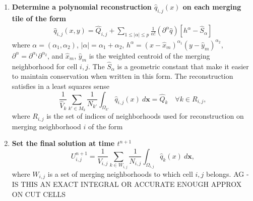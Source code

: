 \begin{enumerate}
\item \textbf{Determine a polynomial reconstruction $\hat q_{i,j}(x)$ on 
each merging tile of the form}
\begin{equation}\label{eq:q}
\begin{aligned}
    \hat q_{i,j} (x,y) = \widehat{Q}_{i,j} +  \sum_{1 \leq |\alpha| \leq p}  \frac{1}{\alpha!} (\partial^{\alpha} \hat q) [h^{\alpha}-\hat S_{\alpha}]
\end{aligned}
\end{equation}
where $\alpha = (\alpha_1, \alpha_2)$, $|\alpha| = \alpha_1 + \alpha_2$, $h^{\alpha} = (x-\hat x_m)^{\alpha_1}(y-\hat y_m)^{\alpha_2}$, $\partial^{\alpha} = \partial^{\alpha_1}\partial^{\alpha_2}$,
and $\hat x_m$, $\hat y_m$ is the weighted centroid of the merging
neighborhood for cell $i,j$. 
The $ \hat S_{\alpha}$ is a geometric
constant that make it easier to maintain conservation when written in
this form.  The reconstruction satisfies in a least squares sense
\begin{equation}\label{eq:qi}
\frac{1}{\hat{V}_{k}}\sum_{k' \in M_{k}}\frac{1}{N_{k'}}\int_{\Omega_{k'}} \hat q_{i,j}(x)~d\mathbf{x} = \hat Q_{k} \quad \forall k \in R_{i,j},
\end{equation}
where $R_{i,j}$ is the set of indices of neighborhoods used for reconstruction 
on merging neighborhood $i$ of the form


\item \textbf{Set the final solution at time $t^{n+1}$}
	\begin{equation}\label{eq:final_update}
	U^{n+1}_{i,j} =  \frac{1}{V_{i,j}}\sum_{k \in W_{i,j}}\frac{1}{N_{i,j}}\int_{\Omega_{i,j}} \hat q_{k}(x)~d\mathbf{x} ,
	\end{equation}
	where $W_{i,j}$ is a set of merging neighborhoods to which cell $i,j$ belongs.
        AG - IS THIS AN EXACT INTEGRAL OR ACCURATE ENOUGH APPROX ON CUT CELLS
\end{enumerate}


